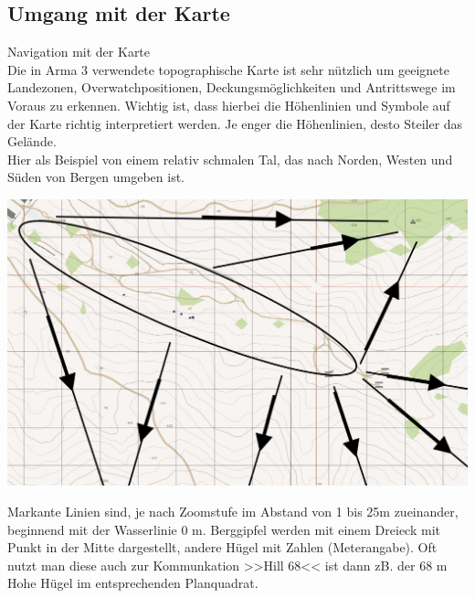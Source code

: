 \pagebreak
\subsection{Umgang mit der Karte}

	Navigation mit der Karte \\

	Die in Arma 3 verwendete topographische Karte ist sehr nützlich um geeignete Landezonen, Overwatchpositionen, Deckungsmöglichkeiten und Antrittswege im Voraus zu erkennen. Wichtig ist, dass hierbei die Höhenlinien und Symbole auf der Karte richtig interpretiert werden. Je enger die Höhenlinien, desto Steiler das Gelände. \\

	Hier als Beispiel von einem relativ schmalen Tal, das nach Norden, Westen und Süden von Bergen umgeben ist. \\
\begin{minipage}[t]{1\textwidth}
	\centering
	\includegraphics[width=\textwidth]{../img/advanced/kartenarbeit/Karte1.png}
\end{minipage}

	Markante Linien sind, je nach Zoomstufe im Abstand von 1 bis 25m zueinander, beginnend mit der Wasserlinie 0 m. Berggipfel werden mit einem Dreieck mit Punkt in der Mitte dargestellt, andere Hügel mit Zahlen (Meterangabe). Oft nutzt man diese auch zur Kommunkation >>Hill 68<< ist dann zB. der 68 m Hohe Hügel im entsprechenden Planquadrat. \\

